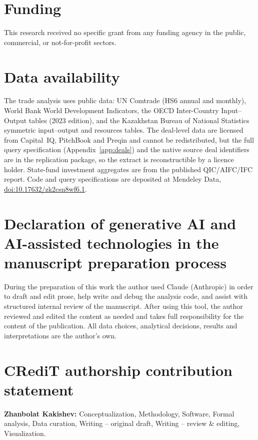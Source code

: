 \documentclass[12pt]{article}
\begin{document}
\section*{Funding}
This research received no specific grant from any funding agency in the public, commercial, or
not-for-profit sectors.

\section*{Data availability}
The trade analysis uses public data: UN Comtrade (HS6 annual and monthly), World Bank World
Development Indicators, the OECD Inter-Country Input--Output tables (2023 edition), and the
Kazakhstan Bureau of National Statistics symmetric input--output and resources tables. The
deal-level data are licensed from Capital~IQ, PitchBook and Preqin and cannot be
redistributed, but the full query specification (Appendix~\ref{app:deals}) and the native
source deal identifiers are in the replication package, so the extract is reconstructible by a
licence holder. State-fund investment aggregates are from the published QIC/AIFC/IFC report.
Code and query specifications are deposited at Mendeley Data,
\href{https://doi.org/10.17632/zk2csn8wf6.1}{doi:10.17632/zk2csn8wf6.1}.

\section*{Declaration of generative AI and AI-assisted technologies in the manuscript preparation process}
During the preparation of this work the author used Claude (Anthropic) in order to draft and
edit prose, help write and debug the analysis code, and assist with structured internal review
of the manuscript. After using this tool, the author reviewed and edited the content as needed
and takes full responsibility for the content of the publication. All data choices, analytical
decisions, results and interpretations are the author's own.

\section*{CRediT authorship contribution statement}
\textbf{Zhanbolat Kakishev:} Conceptualization, Methodology, Software, Formal analysis, Data
curation, Writing -- original draft, Writing -- review \& editing, Visualization.



\end{document}
